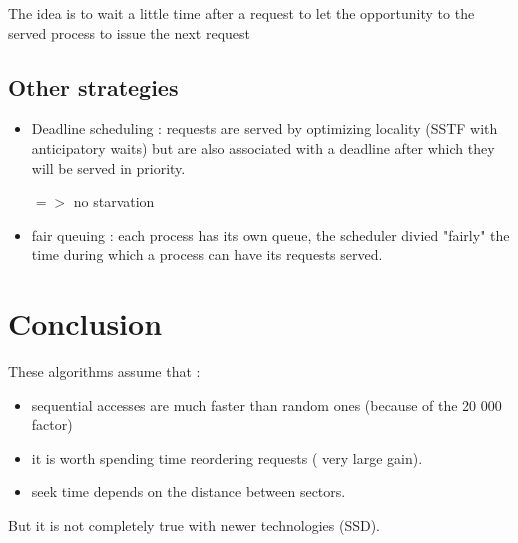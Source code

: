 \documentclass[a4paper,10pt]{article}
\begin{document}
The idea is to wait a little time after a request to let the opportunity to the served process to issue the next request

\subsection{Other strategies}
\begin{itemize}
  \item Deadline scheduling :
  requests are served by optimizing locality (SSTF with anticipatory waits) but are also associated with a deadline after which they will be served in priority.
  
  $=>$ no starvation
  
  \item fair queuing :
  each process has its own queue, the scheduler divied "fairly" the time during which a process can have its requests served.
\end{itemize}

\section{Conclusion}

These algorithms assume that :
\begin{itemize}
  \item sequential accesses are much faster than random ones (because of the 20 000 factor)
  \item it is worth spending time reordering requests ( very large gain).
  \item seek time depends on the distance between sectors.
\end{itemize}

But it is not completely true with newer technologies (SSD).
\end{document}
